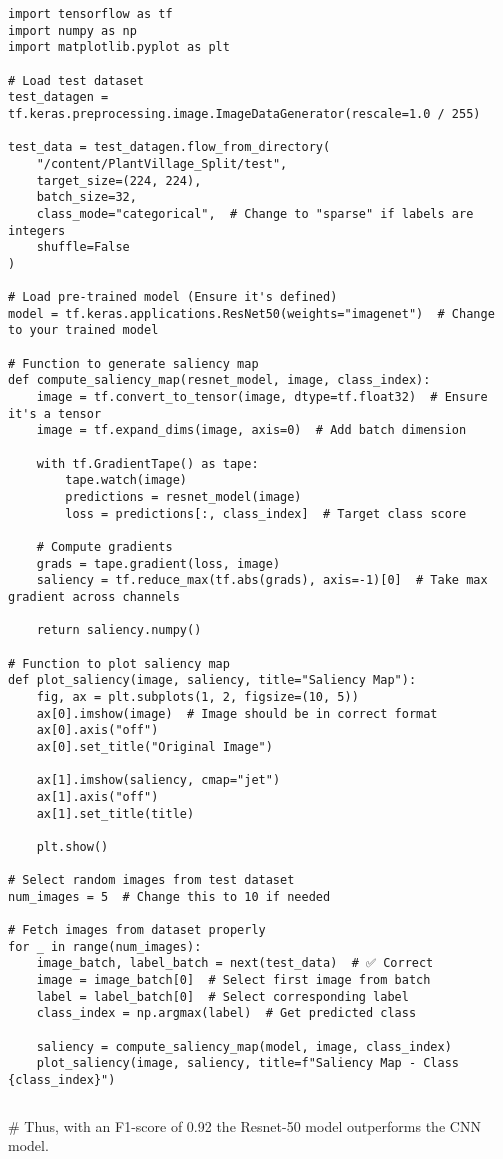 \documentclass{article}
\begin{document}
\begin{lstlisting}
import tensorflow as tf
import numpy as np
import matplotlib.pyplot as plt

# Load test dataset
test_datagen = tf.keras.preprocessing.image.ImageDataGenerator(rescale=1.0 / 255)

test_data = test_datagen.flow_from_directory(
    "/content/PlantVillage_Split/test",
    target_size=(224, 224),
    batch_size=32,
    class_mode="categorical",  # Change to "sparse" if labels are integers
    shuffle=False
)

# Load pre-trained model (Ensure it's defined)
model = tf.keras.applications.ResNet50(weights="imagenet")  # Change to your trained model

# Function to generate saliency map
def compute_saliency_map(resnet_model, image, class_index):
    image = tf.convert_to_tensor(image, dtype=tf.float32)  # Ensure it's a tensor
    image = tf.expand_dims(image, axis=0)  # Add batch dimension

    with tf.GradientTape() as tape:
        tape.watch(image)
        predictions = resnet_model(image)
        loss = predictions[:, class_index]  # Target class score

    # Compute gradients
    grads = tape.gradient(loss, image)
    saliency = tf.reduce_max(tf.abs(grads), axis=-1)[0]  # Take max gradient across channels

    return saliency.numpy()

# Function to plot saliency map
def plot_saliency(image, saliency, title="Saliency Map"):
    fig, ax = plt.subplots(1, 2, figsize=(10, 5))
    ax[0].imshow(image)  # Image should be in correct format
    ax[0].axis("off")
    ax[0].set_title("Original Image")

    ax[1].imshow(saliency, cmap="jet")
    ax[1].axis("off")
    ax[1].set_title(title)

    plt.show()

# Select random images from test dataset
num_images = 5  # Change this to 10 if needed

# Fetch images from dataset properly
for _ in range(num_images):
    image_batch, label_batch = next(test_data)  # ✅ Correct
    image = image_batch[0]  # Select first image from batch
    label = label_batch[0]  # Select corresponding label
    class_index = np.argmax(label)  # Get predicted class

    saliency = compute_saliency_map(model, image, class_index)
    plot_saliency(image, saliency, title=f"Saliency Map - Class {class_index}")
\end{lstlisting}
\begin{lstlisting}

\end{lstlisting}
# Thus, with an F1-score of 0.92 the Resnet-50 model outperforms the CNN model.
\begin{lstlisting}

\end{lstlisting}
\end{document}
